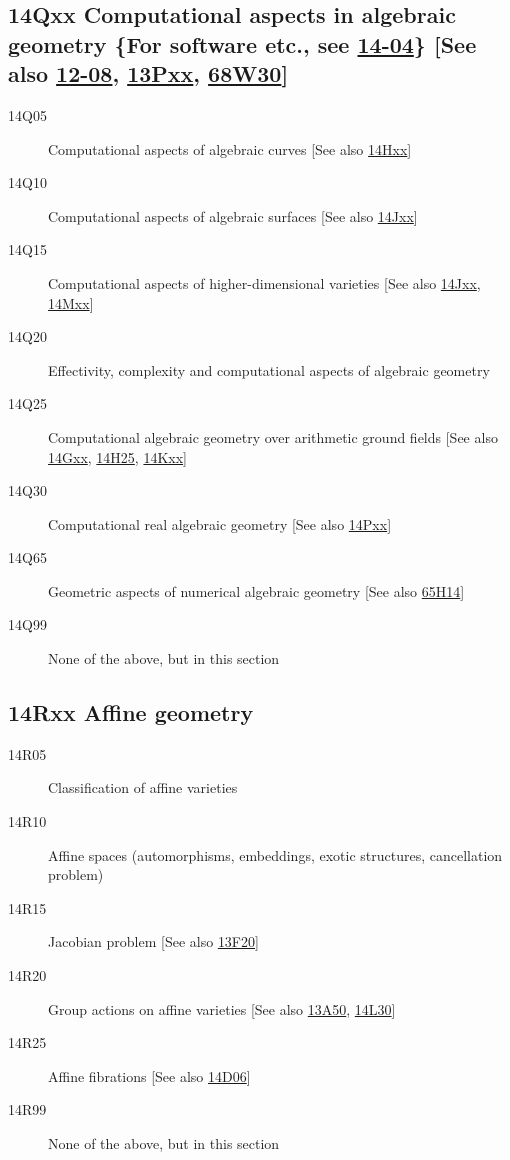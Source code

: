 \subsection*{14Qxx Computational aspects in algebraic geometry \{For software etc., see \hyperref[14-04]{14-04}\} [See also \hyperref[12-08]{12-08}, \hyperref[13Pxx]{13Pxx}, \hyperref[68W30]{68W30}] }\label{14Qxx}
\begin{description}               
\item [14Q05]\label{14Q05} Computational aspects of algebraic curves [See also \hyperref[14Hxx]{14Hxx}]
\item [14Q10]\label{14Q10} Computational aspects of algebraic surfaces [See also \hyperref[14Jxx]{14Jxx}]
\item [14Q15]\label{14Q15} Computational aspects of higher-dimensional varieties [See also \hyperref[14Jxx]{14Jxx}, \hyperref[14Mxx]{14Mxx}]
\item [14Q20]\label{14Q20} Effectivity, complexity and computational aspects of algebraic geometry
\item [14Q25]\label{14Q25} Computational algebraic geometry over arithmetic ground fields [See also \hyperref[14Gxx]{14Gxx}, \hyperref[14H25]{14H25}, \hyperref[14Kxx]{14Kxx}]
\item [14Q30]\label{14Q30} Computational real algebraic geometry [See also \hyperref[14Pxx]{14Pxx}]
\item [14Q65]\label{14Q65} Geometric aspects of numerical algebraic geometry [See also \hyperref[65H14]{65H14}]
\item [14Q99]\label{14Q99} None of the above, but in this section
\end{description}          
\subsection*{14Rxx Affine geometry }\label{14Rxx}
\begin{description}               
\item [14R05]\label{14R05} Classification of affine varieties
\item [14R10]\label{14R10} Affine spaces (automorphisms, embeddings, exotic structures, cancellation problem)
\item [14R15]\label{14R15} Jacobian problem [See also \hyperref[13F20]{13F20}]
\item [14R20]\label{14R20} Group actions on affine varieties [See also \hyperref[13A50]{13A50}, \hyperref[14L30]{14L30}]
\item [14R25]\label{14R25} Affine fibrations [See also \hyperref[14D06]{14D06}]
\item [14R99]\label{14R99} None of the above, but in this section
\end{description}          
